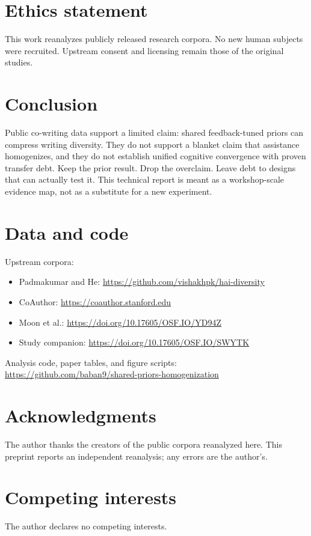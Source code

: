 \documentclass[11pt]{article}
\begin{document}
\section*{Ethics statement}
This work reanalyzes publicly released research corpora.
No new human subjects were recruited.
Upstream consent and licensing remain those of the original studies.

\section{Conclusion}

Public co-writing data support a limited claim: shared feedback-tuned priors can compress writing diversity.
They do not support a blanket claim that assistance homogenizes, and they do not establish unified cognitive convergence with proven transfer debt.
Keep the prior result. Drop the overclaim. Leave debt to designs that can actually test it.
This technical report is meant as a workshop-scale evidence map, not as a substitute for a new experiment.

\section*{Data and code}
Upstream corpora:
\begin{itemize}
  \item Padmakumar and He: \url{https://github.com/vishakhpk/hai-diversity}
  \item CoAuthor: \url{https://coauthor.stanford.edu}
  \item Moon et al.: \url{https://doi.org/10.17605/OSF.IO/YD94Z}
  \item Study companion: \url{https://doi.org/10.17605/OSF.IO/SWYTK}
\end{itemize}
Analysis code, paper tables, and figure scripts:\\
\url{https://github.com/baban9/shared-priors-homogenization}

\section*{Acknowledgments}
The author thanks the creators of the public corpora reanalyzed here.
This preprint reports an independent reanalysis; any errors are the author's.

\section*{Competing interests}
The author declares no competing interests.



\end{document}
